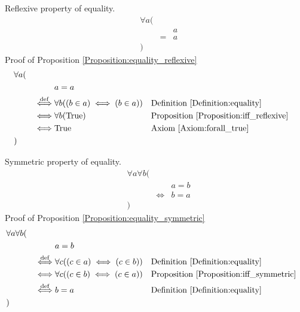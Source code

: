 \begin{prop}
\label{Proposition:equality_reflexive}
Reflexive property of equality.
\begin{align*}
& \forall a ( \\
& & & a \\
& & = & a \\
& )
\end{align*}
Proof of Proposition \ref{Proposition:equality_reflexive}
\begin{align*}
& \forall a ( \\
& & & a = a \\
& & \overset{\operatorname{def}}{\iff} & \forall b ((b \in a) \iff (b \in a))
& & \text{Definition \ref{Definition:equality}} \\
& & \iff & \forall b (\text{True})
& & \text{Proposition \ref{Proposition:iff_reflexive}} \\
& & \iff & \text{True}
& & \text{Axiom \ref{Axiom:forall_true}} \\
& )
\end{align*}
\end{prop}

\begin{prop}
\label{Proposition:equality_symmetric}
Symmetric property of equality.
\begin{align*}
& \forall a \forall b ( \\
& & & a = b \\
& & \iff & b = a \\
& )
\end{align*}
Proof of Proposition \ref{Proposition:equality_symmetric}
\begin{align*}
& \forall a \forall b ( \\
& & & a = b \\
& & \overset{\operatorname{def}}{\iff} & \forall c ((c \in a) \iff (c \in b))
& & \text{Definition \ref{Definition:equality}} \\
& & \iff & \forall c ((c \in b) \iff (c \in a))
& & \text{Proposition \ref{Proposition:iff_symmetric}} \\
& & \overset{\operatorname{def}}{\iff} & b = a
& & \text{Definition \ref{Definition:equality}} \\
& )
\end{align*}
\end{prop}

